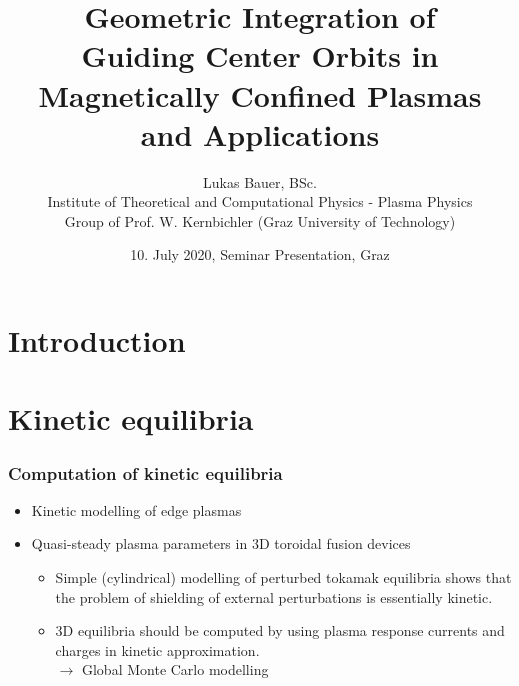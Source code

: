 \documentclass{beamer}
\title[]
{Geometric Integration of \\Guiding Center Orbits in Magnetically Confined Plasmas and Applications}
\author[L.~Bauer]{\scriptsize Lukas Bauer, BSc. \\
	Institute of Theoretical and Computational Physics - Plasma Physics\\Group of Prof. W. Kernbichler (Graz University of Technology)
}
\date{10. July 2020, Seminar Presentation, Graz} %
\institute[Institute of Theoretical and Computational Physics]
{
}
\begin{document}
\titleframe


\section{Introduction}








\section{Kinetic equilibria}

\begin{frame}
\frametitle{Computation of kinetic equilibria}
\begin{itemize}
\item Kinetic modelling of edge plasmas
\item Quasi-steady plasma parameters in 3D toroidal fusion devices
\begin{itemize}
\item Simple (cylindrical) modelling of perturbed tokamak equilibria shows that the problem of shielding of external perturbations is essentially kinetic.
\item 3D equilibria should be computed by using plasma response currents and charges in kinetic approximation. \\
$\rightarrow$ Global Monte Carlo modelling
\end{itemize}
\end{itemize}
\end{frame}

\end{document}
